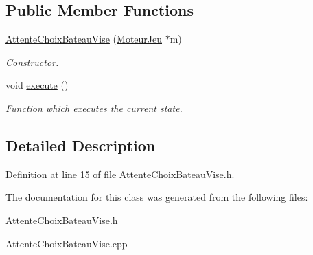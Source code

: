 \subsection*{Public Member Functions}
\begin{DoxyCompactItemize}
\item 
\hypertarget{class_attente_choix_bateau_vise_a387054d78b600a2ba953cf78813bfb5d}{
\hyperlink{class_attente_choix_bateau_vise_a387054d78b600a2ba953cf78813bfb5d}{AttenteChoixBateauVise} (\hyperlink{class_moteur_jeu}{MoteurJeu} $\ast$m)}
\label{class_attente_choix_bateau_vise_a387054d78b600a2ba953cf78813bfb5d}

\begin{DoxyCompactList}\small\item\em Constructor. \item\end{DoxyCompactList}\item 
\hypertarget{class_attente_choix_bateau_vise_ab18e139996328ffb07bfbf988fe8fbba}{
void \hyperlink{class_attente_choix_bateau_vise_ab18e139996328ffb07bfbf988fe8fbba}{execute} ()}
\label{class_attente_choix_bateau_vise_ab18e139996328ffb07bfbf988fe8fbba}

\begin{DoxyCompactList}\small\item\em Function which executes the current state. \item\end{DoxyCompactList}\end{DoxyCompactItemize}


\subsection{Detailed Description}


Definition at line 15 of file AttenteChoixBateauVise.h.



The documentation for this class was generated from the following files:\begin{DoxyCompactItemize}
\item 
\hyperlink{_attente_choix_bateau_vise_8h}{AttenteChoixBateauVise.h}\item 
AttenteChoixBateauVise.cpp\end{DoxyCompactItemize}
